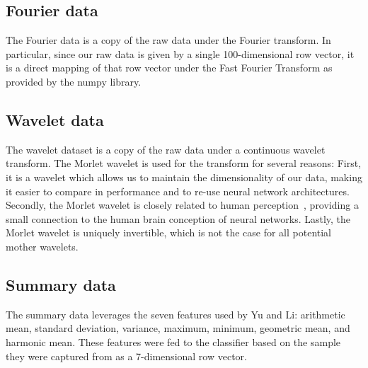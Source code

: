 \subsection{Fourier data}
The Fourier data is a copy of the raw data under the Fourier transform.
In particular, since our raw data is given by a single 100-dimensional row vector, it is a direct mapping of that row vector under the Fast Fourier Transform as provided by the numpy library.

\subsection{Wavelet data}
The wavelet dataset is a copy of the raw data under a continuous wavelet transform. 
The Morlet wavelet is used for the transform for several reasons:
First, it is a wavelet which allows us to maintain the dimensionality of our data, making it easier to compare in performance and to re-use neural network architectures.
Secondly, the Morlet wavelet is closely related to human perception~\cite{mallat1999wavelet, daugman1985uncertainty}, providing a small connection to the human brain conception of neural networks.
Lastly, the Morlet wavelet is uniquely invertible, which is not the case for all potential mother wavelets. 

\subsection{Summary data}
The summary data leverages the seven features used by Yu and Li: arithmetic mean, standard deviation, variance, maximum, minimum, geometric mean, and harmonic mean. 
These features were fed to the classifier based on the sample they were captured from as a 7-dimensional row vector.

